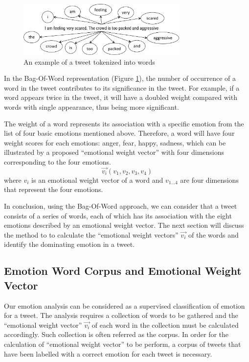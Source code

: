 \begin{figure}[htb!] 
\centering    
\includegraphics[width=0.75\textwidth]{BagOfWord}
\caption{An example of a tweet tokenized into words}
\label{fig:bagOfWord}
\end{figure}

In the Bag-Of-Word representation (Figure \ref{fig:bagOfWord}), the number of occurrence of a word in the tweet contributes to its significance in the tweet. For example, if a word appears twice in the tweet, it will have a doubled weight compared with words with single appearance, thus being more significant. 

The weight of a word represents its association with a specific emotion from the list of four basic emotions mentioned above. Therefore, a word will have four weight scores for each emotions: anger, fear, happy, sadness, which can be illustrated by a proposed ``emotional weight vector'' with four dimensions corresponding to the four emotions. 
\[
	\vec{v_i}(v_1, v_2, v_3, v_4)
\] where \(v_i\) is an emotional weight vector of a word and \(v_{1...4}\) are four dimensions that represent the four emotions.

In conclusion, using the Bag-Of-Word approach, we can consider that a tweet consists of a series of words, each of which has its association with the eight emotions described by an emotional weight vector. The next section will discuss the method to to calculate the ``emotional weight vectors'' \(\vec{v_i}\) of the words and identify the dominating emotion in a tweet.

\subsection{Emotion Word Corpus and Emotional Weight Vector}
Our emotion analysis can be considered as a supervised classification of emotion for a tweet. The analysis requires a collection of words to be gathered and the ``emotional weight vector'' \(\vec{v_i}\) of each word in the collection must be calculated accordingly. Such collection is often referred as the corpus. In order for the calculation of ``emotional weight vector'' to be perform, a corpus of tweets that have been labelled with a correct emotion for each tweet is necessary.

